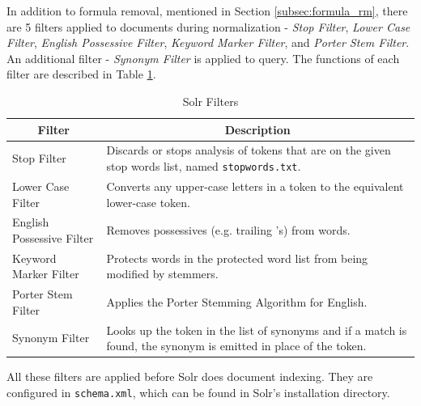 In addition to formula removal, mentioned in Section \ref{subsec:formula_rm}, there are 5 filters applied to documents during normalization - \textit{Stop Filter}, \textit{Lower Case Filter}, \textit{English Possessive Filter}, \textit{Keyword Marker Filter}, and \textit{Porter Stem Filter}. An additional filter - \textit{Synonym Filter} is applied to query. The functions of each filter are described in Table \ref{tbl:solr_filters}.

\begin{table}[!htbp]
\centering
\begingroup
\renewcommand{\arraystretch}{1.2}
\caption{Solr Filters}
\label{tbl:solr_filters}
\begin{tabular}{l p{8cm}}
\toprule
\multicolumn{1}{c}{\textbf{Filter}} & \multicolumn{1}{c}{\textbf{Description}} \\ \midrule
Stop Filter & Discards or stops analysis of tokens that are on the given stop words list, named \texttt{stopwords.txt}. \\ \hline
Lower Case Filter & Converts any upper-case letters in a token to the equivalent lower-case token. \\ \hline
English Possessive Filter & Removes possessives (e.g. trailing 's) from words. \\ \hline
Keyword Marker Filter & Protects words in the protected word list from being modified by stemmers. \\ \hline
Porter Stem Filter & Applies the Porter Stemming Algorithm for English. \\ \hline
Synonym Filter & Looks up the token in the list of synonyms and if a match is found, the synonym is emitted in place of the token. 
\\ \bottomrule
\end{tabular}
\endgroup
\end{table}

All these filters are applied before Solr does document indexing. They are configured in \texttt{schema.xml}, which can be found in Solr's installation directory.





